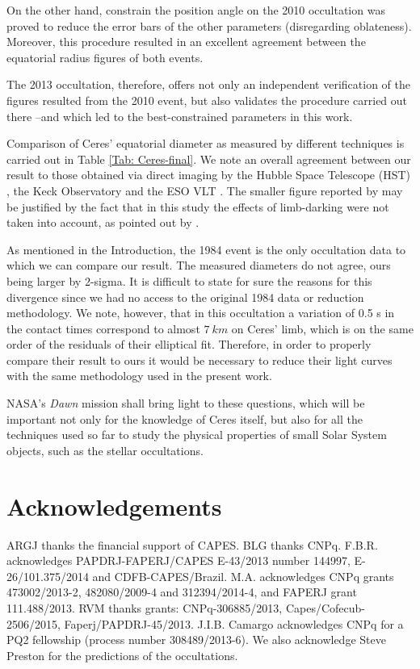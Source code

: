 \documentclass[useAMS,usenatbib]{mn2e}
\begin{document}
On the other hand, constrain the position angle on the 2010 occultation was proved to reduce the error bars of the other parameters (disregarding oblateness). Moreover, this procedure resulted in an excellent agreement between the equatorial radius figures of both events.

The 2013 occultation, therefore, offers not only an independent verification of the figures resulted from the 2010 event, but also validates the procedure carried out there --and which led to the best-constrained parameters in this work.

Comparison of Ceres' equatorial diameter as measured by different techniques is carried out in Table \ref{Tab: Ceres-final}. We note an overall agreement between our result to those obtained via direct imaging by the Hubble Space Telescope (HST) \citep{Thomas2005}, the Keck Observatory and the ESO VLT \citep{Drummond2014}. The smaller figure reported by \cite{Carry2008} may be justified by the fact that in this study the effects of limb-darking were not taken into account, as pointed out by \cite{Drummond2014}.

As mentioned in the Introduction, the 1984 event \citep{Millis1987} is the only occultation data to which we can compare our result. The measured diameters do not agree, ours being larger by 2-sigma. It is difficult to state for sure the reasons for this divergence since we had no access to the original 1984 data or reduction methodology. We note, however, that in this occultation a variation of 0.5 s in the contact times correspond to almost $7~km$ on Ceres' limb, which is on the same order of the residuals of their elliptical fit. Therefore, in order to properly compare their result to ours it would be necessary to reduce their light curves with the same methodology used in the present work.

NASA's \textit{Dawn} mission shall bring light to these questions, which will be important not only for the knowledge of Ceres itself, but also for all the techniques used so far to study the physical properties of small Solar System objects, such as the stellar occultations.





\section*{Acknowledgements}

ARGJ thanks the financial support of CAPES. BLG thanks CNPq. F.B.R. acknowledges PAPDRJ-FAPERJ/CAPES E-43/2013 number 144997, E-26/101.375/2014 and CDFB-CAPES/Brazil. M.A. acknowledges CNPq grants 473002/2013-2, 482080/2009-4 and 312394/2014-4, and FAPERJ grant 111.488/2013. RVM thanks grants: CNPq-306885/2013, Capes/Cofecub-2506/2015, Faperj/PAPDRJ-45/2013. J.I.B. Camargo acknowledges CNPq for a PQ2 fellowship (process number 308489/2013-6). We also acknowledge Steve Preston for the predictions of the occultations.
\end{document}
